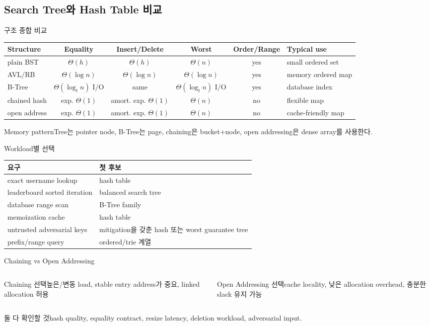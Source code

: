 \subsection{Search Tree와 Hash Table 비교}
\begin{frame}{구조 종합 비교}
\scriptsize\centering\begin{tabular}{lcccc>{\raggedright\arraybackslash}p{2.2cm}}\toprule
Structure&Equality&Insert/Delete&Worst&Order/Range&Typical use\\\midrule
plain BST&$\Theta(h)$&$\Theta(h)$&$\Theta(n)$&yes&small ordered set\\
AVL/RB&$\Theta(\log n)$&$\Theta(\log n)$&$\Theta(\log n)$&yes&memory ordered map\\
B-Tree&$\Theta(\log_t n)$ I/O&same&$\Theta(\log_t n)$ I/O&yes&database index\\
chained hash&exp. $\Theta(1)$&amort. exp. $\Theta(1)$&$\Theta(n)$&no&flexible map\\
open address&exp. $\Theta(1)$&amort. exp. $\Theta(1)$&$\Theta(n)$&no&cache-friendly map\\\bottomrule
\end{tabular}
\begin{block}{Memory pattern}Tree는 pointer node, B-Tree는 page, chaining은 bucket+node, open addressing은 dense array를 사용한다.\end{block}
\end{frame}
\begin{frame}{Workload별 선택}
\small\centering\begin{tabular}{ll}\toprule
요구&첫 후보\\\midrule
exact username lookup&hash table\\
leaderboard sorted iteration&balanced search tree\\
database range scan&B-Tree family\\
memoization cache&hash table\\
untrusted adversarial keys&mitigation을 갖춘 hash 또는 worst guarantee tree\\
prefix/range query&ordered/trie 계열\\\bottomrule
\end{tabular}
\end{frame}
\begin{frame}{Chaining vs Open Addressing}
\begin{columns}[T]
\begin{block}{Chaining 선택}높은/변동 load, stable entry address가 중요, linked allocation 허용\end{block}
\begin{block}{Open Addressing 선택}cache locality, 낮은 allocation overhead, 충분한 slack 유지 가능\end{block}
\end{columns}
\begin{alertblock}{둘 다 확인할 것}hash quality, equality contract, resize latency, deletion workload, adversarial input.\end{alertblock}
\end{frame}
